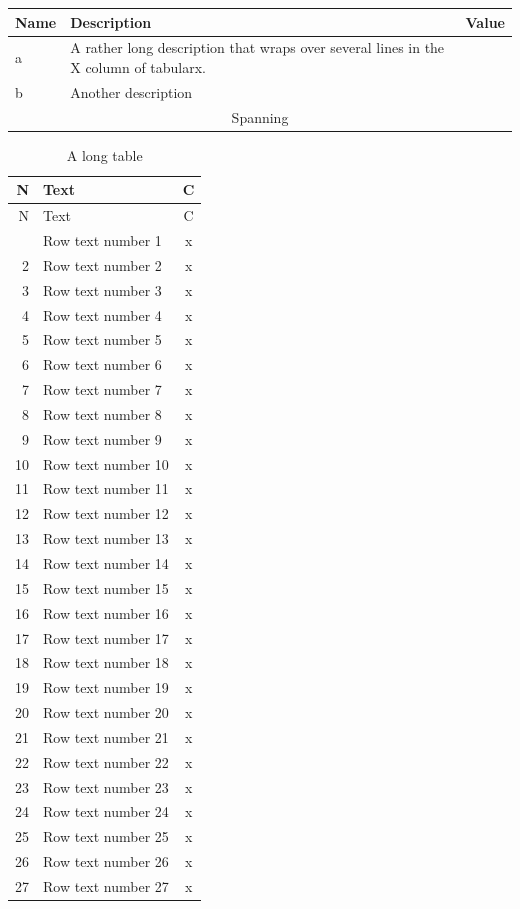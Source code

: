 \documentclass{article}
\begin{document}
\begin{tabularx}{\textwidth}{|l|X|>{\raggedleft\arraybackslash}X|}\hline
Name&Description&Value\\\hline
a&A rather long description that wraps over several lines in the X column of tabularx.&1\\\hline
b&Another description&22\\\hline\multicolumn{3}{|c|}{Spanning}\\\hline\end{tabularx}
\begin{longtable}{|r|p{5cm}|c|}
\caption{A long table}\\\hline N&Text&C\\\hline\endfirsthead
\hline N&Text&C\\\hline\endhead\hline\endfoot\hline\endlastfoot
1&Row text number 1&x\\
2&Row text number 2&x\\
3&Row text number 3&x\\
4&Row text number 4&x\\
5&Row text number 5&x\\
6&Row text number 6&x\\
7&Row text number 7&x\\
8&Row text number 8&x\\
9&Row text number 9&x\\
10&Row text number 10&x\\
11&Row text number 11&x\\
12&Row text number 12&x\\
13&Row text number 13&x\\
14&Row text number 14&x\\
15&Row text number 15&x\\
16&Row text number 16&x\\
17&Row text number 17&x\\
18&Row text number 18&x\\
19&Row text number 19&x\\
20&Row text number 20&x\\
21&Row text number 21&x\\
22&Row text number 22&x\\
23&Row text number 23&x\\
24&Row text number 24&x\\
25&Row text number 25&x\\
26&Row text number 26&x\\
27&Row text number 27&x\\

\end{longtable}
\end{document}
